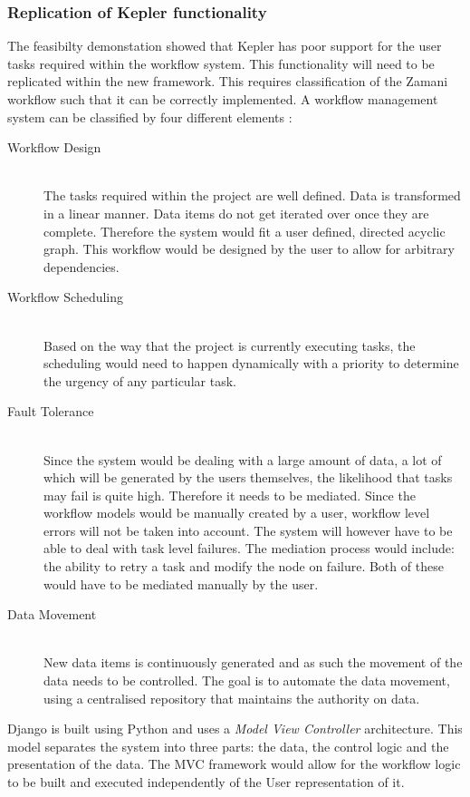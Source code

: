 \documentclass[12pt,a4paper]{report}
\begin{document}
\subsubsection{Replication of Kepler functionality}
The feasibilty demonstation showed that Kepler has poor support for the user
tasks required within the workflow system. This functionality will need to
be replicated within the new framework. This requires classification
of the Zamani workflow such that it can be correctly implemented.
A workflow management system can be classified by four different elements
\cite{yu2005taxonomy}:
\begin{description}
    \item[Workflow Design] \hfill \\
        The tasks required within the project are well defined.
        Data is transformed in a linear manner. Data items do not get iterated over
        once they are complete. Therefore the system would fit a user defined,
        directed acyclic graph. This workflow would be designed by the user to
        allow for arbitrary dependencies.
    \item[Workflow Scheduling] \hfill \\
        Based on the way that the project is currently executing tasks, the scheduling
        would need to happen dynamically with a priority to determine the
        urgency of any particular task.
    \item[Fault Tolerance] \hfill \\
        Since the system would be dealing with a large amount of data, a lot of which
        will be generated by the users themselves, the likelihood that tasks may fail
        is quite high. Therefore it needs to be mediated. Since the workflow models
        would be manually created by a user, workflow level errors will not be taken
        into account. The system will however have to be able to deal with task level
        failures. The mediation process would include: the ability to retry a task
        and modify the node on failure. Both of these would have to be mediated manually
        by the user.
    \item[Data Movement] \hfill \\
        New data items is continuously generated and as such the movement of the data needs
        to be controlled. The goal is to automate the data movement, using a centralised
        repository that maintains the authority on data.
\end{description}
Django is built using Python and uses a \emph{Model View Controller}
architecture\cite{leff2001web}. This model separates the system into three parts: the
data, the control logic and the presentation of the data. The MVC framework would allow for
the workflow logic to be built and executed independently of the User representation of it.
\end{document}
